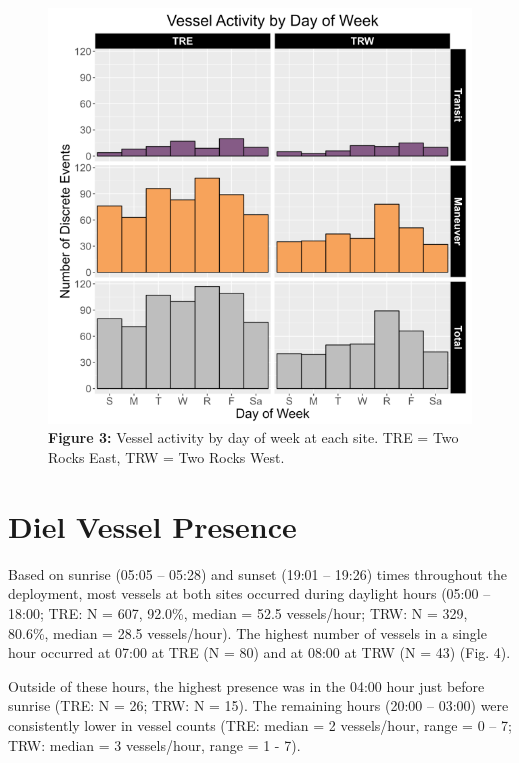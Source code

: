 \documentclass[
  letterpaper,
  oneside,
  open=any]{scrbook}
\begin{document}
\begin{figure}[H]

{\centering \includegraphics{images/Figure.3.PNG}

}

\caption{\textbf{Figure 3:} Vessel activity by day of week at each site.
TRE = Two Rocks East, TRW = Two Rocks West.}

\end{figure}%

\section{Diel Vessel Presence}\label{diel-vessel-presence}

Based on sunrise (05:05 -- 05:28) and sunset (19:01 -- 19:26) times
throughout the deployment, most vessels at both sites occurred during
daylight hours (05:00 -- 18:00; TRE: N = 607, 92.0\%, median = 52.5
vessels/hour; TRW: N = 329, 80.6\%, median = 28.5 vessels/hour). The
highest number of vessels in a single hour occurred at 07:00 at TRE (N =
80) and at 08:00 at TRW (N = 43) (Fig. 4).

Outside of these hours, the highest presence was in the 04:00 hour just
before sunrise (TRE: N = 26; TRW: N = 15). The remaining hours (20:00 --
03:00) were consistently lower in vessel counts (TRE: median = 2
vessels/hour, range = 0 -- 7; TRW: median = 3 vessels/hour, range = 1 -
7).
\end{document}
